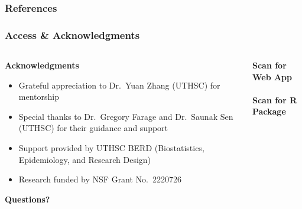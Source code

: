 \documentclass{beamer}
\begin{document}
\begin{frame}[allowframebreaks]
\frametitle{References}
\scriptsize


\end{frame}

\begin{frame}
\frametitle{Access \& Acknowledgments}
\begin{columns}[T]
\begin{column}{0.5\textwidth}
\scriptsize
    \textbf{Acknowledgments}
 \begin{itemize}
        \item Grateful appreciation to Dr.\ Yuan Zhang (UTHSC) for mentorship
        \item Special thanks to Dr.\ Gregory Farage and Dr.\ Saunak Sen (UTHSC) for their guidance and support
        \item Support provided by UTHSC BERD (Biostatistics, Epidemiology, and Research Design)
        \item Research funded by NSF Grant No.\ 2220726
    \end{itemize}
\vfill
\begin{center}
\Huge{\textbf{Questions?}}
\end{center}
\end{column}
    \begin{column}{0.5\textwidth}
    \scriptsize
        \centering
        \textbf{Scan for Web App} \\
        \vspace{2em}
        \\
        \textbf{Scan for R Package} \\
    \end{column}
\end{columns}
\end{frame}
\end{document}
